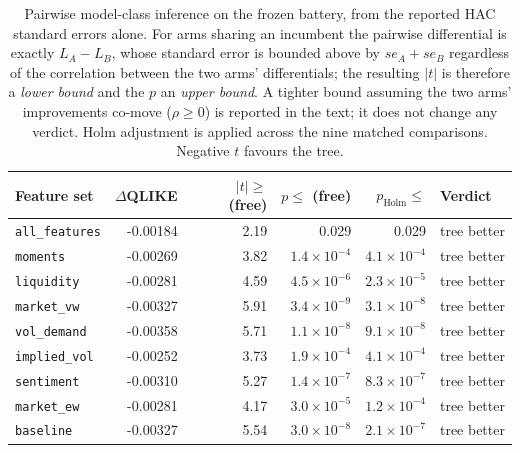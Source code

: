 \begin{table}[H]
\centering
\caption{Pairwise model-class inference on the frozen battery, from the
reported HAC standard errors alone. For arms sharing an incumbent the
pairwise differential is exactly $L_A-L_B$, whose standard error is bounded
above by $se_A+se_B$ regardless of the correlation between the two arms'
differentials; the resulting $|t|$ is therefore a \emph{lower bound} and the
$p$ an \emph{upper bound}. A tighter bound assuming the two arms'
improvements co-move ($\rho\ge 0$) is reported in the text; it does not
change any verdict. Holm adjustment is applied across the nine matched
comparisons. Negative $t$ favours the tree.}
\label{tab:pairwise_bounds}
\begin{tabular}{lrrrrl}
\toprule
Feature set & $\Delta$QLIKE & $|t|\ge$ (free) & $p\le$ (free) & $p_{\text{Holm}}\le$ & Verdict \\
\midrule
\texttt{all\_features} & -0.00184 & 2.19 & 0.029 & 0.029 & tree better \\
\texttt{moments} & -0.00269 & 3.82 & $1.4\times 10^{-4}$ & $4.1\times 10^{-4}$ & tree better \\
\texttt{liquidity} & -0.00281 & 4.59 & $4.5\times 10^{-6}$ & $2.3\times 10^{-5}$ & tree better \\
\texttt{market\_vw} & -0.00327 & 5.91 & $3.4\times 10^{-9}$ & $3.1\times 10^{-8}$ & tree better \\
\texttt{vol\_demand} & -0.00358 & 5.71 & $1.1\times 10^{-8}$ & $9.1\times 10^{-8}$ & tree better \\
\texttt{implied\_vol} & -0.00252 & 3.73 & $1.9\times 10^{-4}$ & $4.1\times 10^{-4}$ & tree better \\
\texttt{sentiment} & -0.00310 & 5.27 & $1.4\times 10^{-7}$ & $8.3\times 10^{-7}$ & tree better \\
\texttt{market\_ew} & -0.00281 & 4.17 & $3.0\times 10^{-5}$ & $1.2\times 10^{-4}$ & tree better \\
\texttt{baseline} & -0.00327 & 5.54 & $3.0\times 10^{-8}$ & $2.1\times 10^{-7}$ & tree better \\
\bottomrule
\end{tabular}
\end{table}
